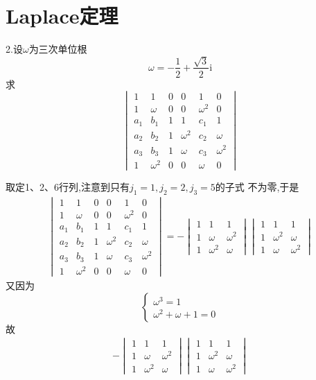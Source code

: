 \section{Laplace定理}
2.设$\omega$为三次单位根
\[
\omega = - \frac{1}{2}+\frac{\sqrt{3}}{2}\mathrm{i}
\]
求
\[
\begin{vmatrix}
	1&1&0&0&1&0\\
	1&\omega&0&0&\omega^2&0\\
	a_1&b_1&1&1&c_1&1\\
	a_2&b_2&1&\omega^2&c_2&\omega\\
	a_3&b_3&1&\omega&c_3&\omega^2\\
	1&\omega^2&0&0&\omega&0
\end{vmatrix}
\]
\begin{solution}
	取定\textup{1、2、6}行列,注意到只有$j_1=1,j_2=2,j_3=5$的子式
	不为零,于是
	\begin{align*}
		\begin{vmatrix}
	1&1&0&0&1&0\\
	1&\omega&0&0&\omega^2&0\\
	a_1&b_1&1&1&c_1&1\\
	a_2&b_2&1&\omega^2&c_2&\omega\\
	a_3&b_3&1&\omega&c_3&\omega^2\\
	1&\omega^2&0&0&\omega&0
\end{vmatrix}=-\begin{vmatrix}
	1&1&1\\
	1&\omega&\omega^2\\
	1&\omega^2&\omega
\end{vmatrix}\begin{vmatrix}
	1&1&1\\
	1&\omega^2&\omega\\
	1&\omega&\omega^2
\end{vmatrix}
	\end{align*}
	又因为
	\[
	\begin{cases*}
	\omega^3=1\\
	\omega^2+\omega+1=0
	\end{cases*}
	\]
	故
	\begin{align*}
		-\begin{vmatrix}
	1&1&1\\
	1&\omega&\omega^2\\
	1&\omega^2&\omega
\end{vmatrix}\begin{vmatrix}
	1&1&1\\
	1&\omega^2&\omega\\
	1&\omega&\omega^2

\end{vmatrix}
\end{align*}
\end{solution}
